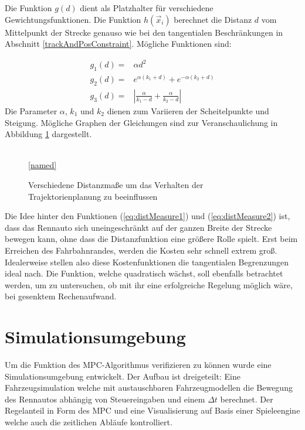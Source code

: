 \documentclass{like}
\begin{document}
Die Funktion $g(d)$ dient als Platzhalter für verschiedene Gewichtungsfunktionen. Die Funktion $h(\vec{x}_i)$ berechnet die Distanz \(d\) vom Mittelpunkt der Strecke genauso wie bei den tangentialen Beschränkungen in Abschnitt \ref{trackAndPosConstraint}. Mögliche Funktionen sind:

\begin{eqnarray}
	g_1(d) = &\alpha d^2 \\
	g_2(d) = &e^{\alpha (k_1 + d)} + e^{-\alpha(k_2 + d)} \label{eq:distMeasure1}\\
	g_3(d) = &|\frac{\alpha}{k_1-d} + \frac{\alpha}{k_2 - d}| \label{eq:distMeasure2}
\end{eqnarray}
Die Parameter $\alpha$, $k_1$ und $k_2$ dienen zum Variieren der Scheitelpunkte und Steigung.
Mögliche Graphen der Gleichungen sind zur Veranschaulichung in Abbildung \ref{fig:elasticCost} dargestellt.

\begin{figure}[ht!]
	\centering
	 
	\\
	\ref{named}
	\caption{Verschiedene Distanzmaße um das Verhalten der Trajektorienplanung zu beeinflussen}
	\label{fig:elasticCost}
\end{figure}

Die Idee hinter den Funktionen (\ref{eq:distMeasure1}) und (\ref{eq:distMeasure2}) ist, dass das Rennauto sich uneingeschränkt auf der ganzen Breite der Strecke bewegen kann, ohne dass die Distanzfunktion eine größere Rolle spielt. Erst beim Erreichen des Fahrbahnrandes, werden die Kosten sehr schnell extrem groß. Idealerweise stellen also diese Kostenfunktionen die tangentialen Begrenzungen ideal nach. Die Funktion, welche quadratisch wächst, soll ebenfalls betrachtet werden, um zu untersuchen, ob mit ihr eine erfolgreiche Regelung möglich wäre, bei gesenktem Rechenaufwand. 



\chapter{Simulationsumgebung}
Um die Funktion des \ac{MPC}-Algorithmus verifizieren zu können wurde eine Simulationsumgebung entwickelt. Der Aufbau ist dreigeteilt: Eine Fahrzeugsimulation welche mit austauschbaren Fahrzeugmodellen die Bewegung des Rennautos abhängig von Steuereingaben und einem $\Delta t$ berechnet. Der Regelanteil in Form des \ac{MPC} und eine Visualisierung auf Basis einer Spieleengine welche auch die zeitlichen Abläufe kontrolliert. 
\end{document}

